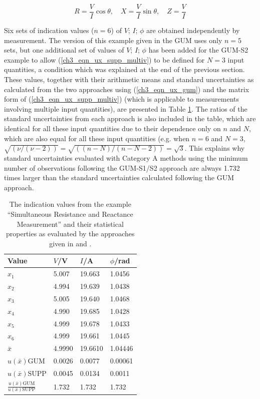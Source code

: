 \documentclass[../thesis/thesis.tex]{subfiles}
\begin{document}
\begin{refsection}
\begin{equation}
R=\frac VI\cos\theta, \quad X=\frac VI\sin\theta, \quad Z=\frac VI
\end{equation}

Six sets of indication values \cite{VIM} ($n = 6$) of $V$; $I$; $\phi$ are obtained independently by measurement. The version of this example given in the GUM uses only $n = 5$ sets, but one additional set of values of $V$; $I$; $\phi$ has been added for the GUM-S2 example to allow (\ref{ch3_eqn_ux_supp_multiv}) to be defined for $N = 3$ input quantities, a condition which was explained at the end of the previous section. These values, together with their arithmetic means and standard uncertainties as calculated from the two approaches using (\ref{ch3_eqn_ux_gum}) and the matrix form of (\ref{ch3_eqn_ux_supp_multiv}) (which is applicable to measurements involving multiple input quantities), are presented in Table \ref{ch3_tbl_gum_example}. The ratios of the standard uncertainties from each approach is also included in the table, which are identical for all these input quantities due to their dependence only on $n$ and $N$, which are also equal for all these input quantities (e.g. when $n = 6$ and $N = 3$, $\sqrt{(\nu/(\nu-2))}=\sqrt{((n-N)/(n-N-2))}=\sqrt{3}$. This explains why standard uncertainties evaluated with Category A methods using the minimum number of observations following the GUM-S1/S2 approach are always 1.732 times larger than the standard uncertainties calculated following the GUM approach.

\begin{table}[]
	\begin{tabular}{llll} \toprule
		Value             & $V$/V  & $I$/A   & $\phi$/rad   \\ \midrule
		$x_1$             & 5.007  & 19.663  & 1.0456  \\
		$x_2$             & 4.994  & 19.639  & 1.0438  \\
		$x_3$             & 5.005  & 19.640  & 1.0468  \\
		$x_4$             & 4.990  & 19.685  & 1.0428  \\
		$x_5$             & 4.999  & 19.678  & 1.0433  \\
		$x_6$             & 4.999  & 19.661  & 1.0445  \\ \midrule
		$\bar{x}$         & 4.9990 & 19.6610 & 1.04446 \\ \midrule
		$u(\bar{x})\textrm{GUM}$   & 0.0026 & 0.0077  & 0.00061 \\
		$u(\bar{x})\textrm{SUPP}$  & 0.0045 & 0.0134  & 0.0011  \\ \midrule
		$\frac {u(\bar{x})\textrm{GUM}}{u(\bar{x})\textrm{SUPP}}$ & 1.732  & 1.732   & 1.732 \\ \bottomrule
	\end{tabular}
\caption{The indication values from the example ``Simultaneous Resistance and Reactance Measurement'' and their statistical properties as evaluated by the approaches given in \cite[Example H.2]{GUM_2008} and \cite[Example 9.4]{GUM_S2}.}
\label{ch3_tbl_gum_example}
\end{table}


\end{refsection}
\end{document}

